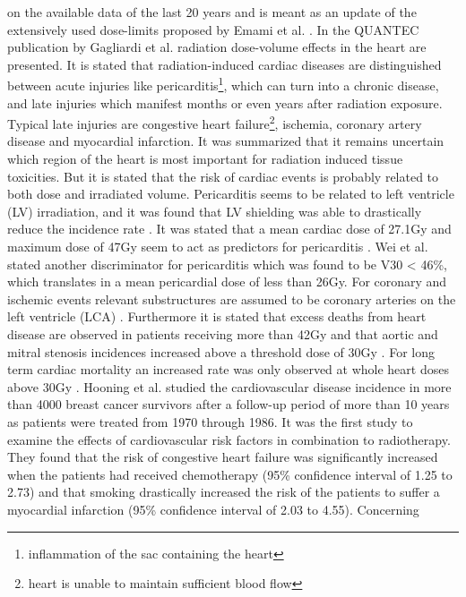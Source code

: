 on the available data of the last 20 years and is meant as an update of the extensively used dose-limits proposed by Emami et al. 
\cite{Ema91}. In the QUANTEC publication by Gagliardi et al. \cite{Gag10} radiation dose-volume effects in the heart are presented. 
It is stated that radiation-induced cardiac diseases are distinguished between acute injuries like pericarditis\footnote{inflammation 
of the sac containing the heart}, which can turn into a chronic disease, and late injuries which manifest months or even 
years after radiation exposure. Typical late injuries are congestive heart failure\footnote{heart is unable to maintain sufficient 
blood flow}, ischemia,
coronary artery disease and myocardial infarction. 
It was summarized that it remains uncertain which region of the heart is most important for radiation induced tissue toxicities. 
But it is stated that the risk of cardiac events is probably related to both dose and irradiated volume. 
Pericarditis seems to be related to left ventricle (LV) irradiation, and it was found that LV shielding was able to drastically 
reduce the incidence rate \cite{Car76}. It was stated that a mean cardiac dose of 27.1Gy and maximum dose of 47Gy seem to act as 
predictors for pericarditis \cite{Mar98}. 
Wei et al. \cite{Wei08} stated another discriminator for pericarditis which was found to be V30 < 46\%, which translates in a mean 
pericardial dose of less than 26Gy. For coronary and ischemic events relevant substructures are assumed to be coronary arteries on 
the left ventricle (LCA) \cite{Nie07, Tay07, Tay08}. Furthermore it is stated that excess deaths from heart disease are observed 
in patients receiving more than 42Gy \cite{Han93} and that aortic and mitral stenosis incidences increased above a threshold dose of 
30Gy \cite{Tay07}. For long term cardiac mortality an increased rate was only observed at whole heart doses above 30Gy \cite{Han93}.\newline
\newline
Hooning et al. \cite{Hoo07} studied the cardiovascular disease incidence in more than 4000 breast cancer survivors 
after a follow-up period of more than 10 years as patients were treated from 1970 through 1986. It was the first study to examine the 
effects of cardiovascular risk factors in combination to radiotherapy. They found that the risk of congestive heart failure was 
significantly increased when the patients had received chemotherapy (95\% confidence interval of 1.25 to 2.73) and that smoking drastically 
increased the risk of the patients to suffer a myocardial infarction (95\% confidence interval of 2.03 to 4.55). Concerning 
